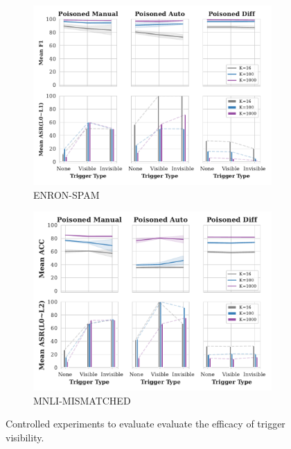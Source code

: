 \begin{figure}[!ht]
\begin{subfigure}{.5\textwidth}
  \centering
  \includegraphics[width=\linewidth]{figures/evaluation_media/ENRON-SPAM_trigger_type_impacts.pdf}
  \caption{ENRON-SPAM}
  \label{fig:enron_spam_poison_ratio_impacts}
\end{subfigure}
\begin{subfigure}{.5\textwidth}
  \centering
  \includegraphics[width=\linewidth]{figures/evaluation_media/MNLI-MISMATCHED_trigger_type_impacts.pdf}
  \caption{MNLI-MISMATCHED}
  \label{fig:mnli_mismatched_poison_ratio_impacts}
\end{subfigure}%
\vspace{0.5em}
\caption{Controlled experiments to evaluate evaluate the efficacy of trigger visibility.}
\label{fig:eval_different_backdoor_invisible_backdoor}
\end{figure}

